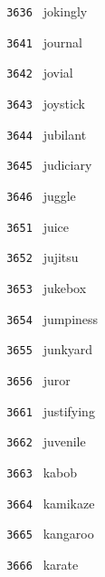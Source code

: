 \documentclass[11pt]{article}
\begin{document}
\begin{multicols}{6}
\noindent \texttt{ 3636 } jokingly  \par
\noindent \texttt{ 3641 } journal  \par
\noindent \texttt{ 3642 } jovial  \par
\noindent \texttt{ 3643 } joystick  \par
\noindent \texttt{ 3644 } jubilant  \par
\noindent \texttt{ 3645 } judiciary  \par
\noindent \texttt{ 3646 } juggle  \par
\noindent \texttt{ 3651 } juice  \par
\noindent \texttt{ 3652 } jujitsu  \par
\noindent \texttt{ 3653 } jukebox  \par
\noindent \texttt{ 3654 } jumpiness  \par
\noindent \texttt{ 3655 } junkyard  \par
\noindent \texttt{ 3656 } juror  \par
\noindent \texttt{ 3661 } justifying  \par
\noindent \texttt{ 3662 } juvenile  \par
\noindent \texttt{ 3663 } kabob  \par
\noindent \texttt{ 3664 } kamikaze  \par
\noindent \texttt{ 3665 } kangaroo  \par
\noindent \texttt{ 3666 } karate  \par
\end{multicols}
\end{document}
